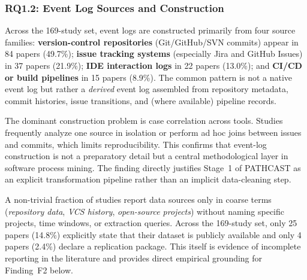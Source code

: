 \subsubsection{RQ1.2: Event Log Sources and Construction}

Across the 169-study set, event logs are constructed primarily from four
source families: \textbf{version-control repositories} (Git/GitHub/SVN
commits) appear in 84 papers (49.7\%); \textbf{issue tracking systems}
(especially Jira and GitHub Issues) in 37 papers (21.9\%); \textbf{IDE
interaction logs} in 22 papers (13.0\%); and \textbf{CI/CD or build
pipelines} in 15 papers (8.9\%). The common pattern is not a native event
log but rather a \emph{derived} event log assembled from repository metadata,
commit histories, issue transitions, and (where available) pipeline records.

The dominant construction problem is case correlation across tools. Studies
frequently analyze one source in isolation or perform ad hoc joins between
issues and commits, which limits reproducibility. This confirms that event-log
construction is not a preparatory detail but a central methodological layer in
software process mining. The finding directly justifies Stage~1 of PATHCAST as
an explicit transformation pipeline rather than an implicit data-cleaning step.

A non-trivial fraction of studies report data sources only in coarse terms
(\textit{repository data}, \textit{VCS history}, \textit{open-source
projects}) without naming specific projects, time windows, or extraction
queries. Across the 169-study set, only 25 papers (14.8\%) explicitly state
that their dataset is publicly available and only 4 papers (2.4\%) declare a
replication package. This itself is evidence of incomplete reporting in the
literature and provides direct empirical grounding for Finding~F2 below.

